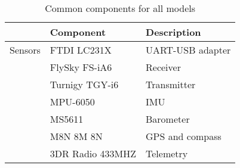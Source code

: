 \begin{table}[H]

\centering
    \caption{Common components for all models}
    \label{tab:comp_common}
    
\begin{tabular}{lll}
\hline
\rowcolor[HTML]{FFFFFF} 
\multicolumn{1}{|l|}{\cellcolor[HTML]{FFFFFF}Category} & \multicolumn{1}{l|}{\cellcolor[HTML]{FFFFFF}Component} & \multicolumn{1}{l|}{\cellcolor[HTML]{FFFFFF}Description}  \\ \hline
\rowcolor[HTML]{9AFF99} 
Sensors                                                & FTDI LC231X                                            & UART-USB adapter                                                                                                    \\
\rowcolor[HTML]{9AFF99} 
                                                       & FlySky FS-iA6                                          & Receiver                                                                                                             \\
\rowcolor[HTML]{9AFF99} 
                                                       & Turnigy TGY-i6                                                       & Transmitter                                                                                                          \\
\rowcolor[HTML]{9AFF99} 
                                                       & MPU-6050                                               & IMU                                                                                                                  \\
\rowcolor[HTML]{9AFF99} 
                                                       & MS5611                                                 & Barometer                                                                                                            \\
\rowcolor[HTML]{9AFF99} 
                                                       & M8N 8M 8N                                              & GPS and compass                                                                                                      \\
\rowcolor[HTML]{9AFF99} 
                                                       & 3DR Radio 433MHZ                                       & Telemetry                                                                                                            \\

\end{tabular}
\end{table}
